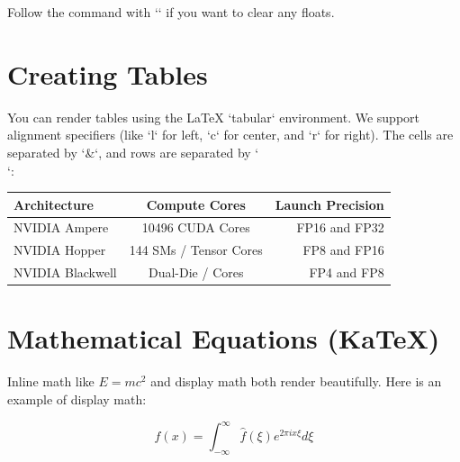 Follow the command with `\clearfloat` if you want to clear any floats.

\section{Creating Tables}
You can render tables using the LaTeX `tabular` environment. We support alignment specifiers (like `l` for left, `c` for center, and `r` for right). The cells are separated by `&`, and rows are separated by `\\`:

\begin{tabular}{|l|c|r|}
\hline
Architecture & Compute Cores & Launch Precision \\
\hline
NVIDIA Ampere & 10496 CUDA Cores & FP16 and FP32 \\
NVIDIA Hopper & 144 SMs / Tensor Cores & FP8 and FP16 \\
NVIDIA Blackwell & Dual-Die / Cores & FP4 and FP8 \\
\hline
\end{tabular}

\section{Mathematical Equations (KaTeX)}
Inline math like $E = mc^2$ and display math both render beautifully. Here is an example of display math:

\[
f(x) = \int_{-\infty}^{\infty} \hat{f}(\xi) e^{2 \pi i x \xi} d\xi
\]


